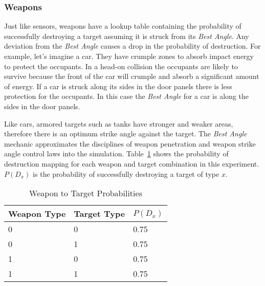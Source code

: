 \subsubsection{Weapons}

Just like sensors, weapons have a lookup table containing the probability of successfully destroying a target assuming it is struck from its \textit{Best Angle}.  Any deviation from the \textit{Best Angle} causes a drop in the probability of destruction.  For example, let's imagine a car.  They have crumple zones to absorb impact energy to protect the occupants.  In a head-on collision the occupants are likely to survive because the front of the car will crumple and absorb a significant amount of energy.  If a car is struck along its sides in the door panels there is less protection for the occupants.  In this case the \textit{Best Angle} for a car is along the sides in the door panels.

Like cars, armored targets such as tanks have stronger and weaker areas, therefore there is an optimum strike angle against the target.  The \textit{Best Angle} mechanic approximates the disciplines of weapon penetration \parencite{wpn_penetration} and weapon strike angle control laws \parencite{ctrl_law_impact_angle} into the simulation. Table~\ref{tab:wpnTgtProb} shows the probability of destruction mapping for each weapon and target combination in this experiment.  $P(D_{x})$ is the probability of successfully destroying a target of type $x$.

\begin{table}[H]
	\caption{Weapon to Target Probabilities}
	\centering
	\label{tab:wpnTgtProb}
	\begin{tabular}{|p{1.5cm}|p{1.5cm}|p{3cm}|}
		\hline
		Weapon Type & Target Type & $P(D_{x})$\\ \hline
		0 & 0 & 0.75 \\ \hline
		0 & 1 & 0.75 \\ \hline
		1 & 0 & 0.75 \\ \hline
		1 & 1 & 0.75 \\ \hline
	\end{tabular}
\end{table}




